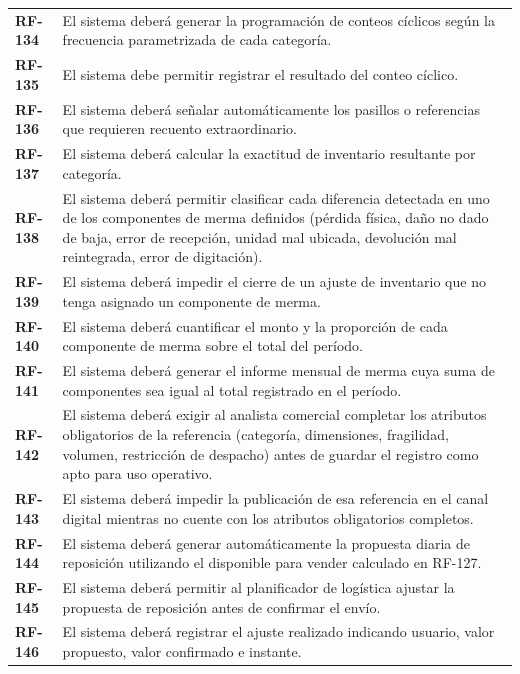 \documentclass[11pt]{article}
\begin{document}
\begin{longtable}[]{@{}
  >{\raggedright\arraybackslash}p{}
  >{\raggedright\arraybackslash}p{}@{}}
\addlinespace[2pt]
\textbf{RF-134} & El sistema deberá generar la programación de conteos cíclicos según la frecuencia parametrizada de cada categoría. \\
\addlinespace[2pt]
\textbf{RF-135} & El sistema debe permitir registrar el resultado del conteo cíclico. \\
\addlinespace[2pt]
\textbf{RF-136} & El sistema deberá señalar automáticamente los pasillos o referencias que requieren recuento extraordinario. \\
\addlinespace[2pt]
\textbf{RF-137} & El sistema deberá calcular la exactitud de inventario resultante por categoría. \\
\addlinespace[2pt]
\textbf{RF-138} & El sistema deberá permitir clasificar cada diferencia detectada en uno de los componentes de merma definidos (pérdida física, daño no dado de baja, error de recepción, unidad mal ubicada, devolución mal reintegrada, error de digitación). \\
\addlinespace[2pt]
\textbf{RF-139} & El sistema deberá impedir el cierre de un ajuste de inventario que no tenga asignado un componente de merma. \\
\addlinespace[2pt]
\textbf{RF-140} & El sistema deberá cuantificar el monto y la proporción de cada componente de merma sobre el total del período. \\
\addlinespace[2pt]
\textbf{RF-141} & El sistema deberá generar el informe mensual de merma cuya suma de componentes sea igual al total registrado en el período. \\
\addlinespace[2pt]
\textbf{RF-142} & El sistema deberá exigir al analista comercial completar los atributos obligatorios de la referencia (categoría, dimensiones, fragilidad, volumen, restricción de despacho) antes de guardar el registro como apto para uso operativo. \\
\addlinespace[2pt]
\textbf{RF-143} & El sistema deberá impedir la publicación de esa referencia en el canal digital mientras no cuente con los atributos obligatorios completos. \\
\addlinespace[2pt]
\textbf{RF-144} & El sistema deberá generar automáticamente la propuesta diaria de reposición utilizando el disponible para vender calculado en RF-127. \\
\addlinespace[2pt]
\textbf{RF-145} & El sistema deberá permitir al planificador de logística ajustar la propuesta de reposición antes de confirmar el envío. \\
\addlinespace[2pt]
\textbf{RF-146} & El sistema deberá registrar el ajuste realizado indicando usuario, valor propuesto, valor confirmado e instante. \\

\end{longtable}
\end{document}
